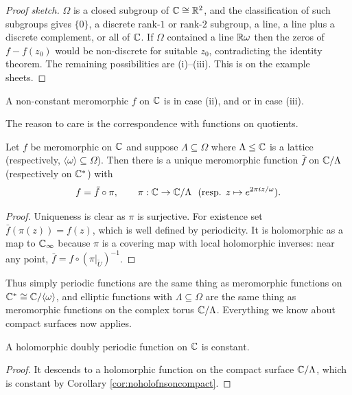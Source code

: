 \documentclass[a4paper]{scrartcl}
\newcommand{\genby}[1]{\langle #1 \rangle}
\newcommand{\Cinf}{\C_\infty}
\newcommand{\Cs}{\C^*}
\begin{document}
\begin{proof}[Proof sketch]
	$\Omega$ is a closed subgroup of $\mathbb{C} \cong \mathbb{R}^2$, and the classification of such
	subgroups gives $\{0\}$, a discrete rank-$1$ or rank-$2$ subgroup, a line, a line plus a
	discrete complement, or all of $\mathbb{C}$. If $\Omega$ contained a line $\mathbb{R}\omega$ then the
	zeros of $f - f(z_0)$ would be non-discrete for suitable $z_0$, contradicting the
	identity theorem. The remaining possibilities are (i)--(iii). This is on the example
	sheets.
\end{proof}

\begin{definition}
	A non-constant meromorphic $f$ on $\mathbb{C}$ is  in case (ii), and
	 or  in case (iii).
\end{definition}

The reason to care is the correspondence with functions on quotients.

\begin{proposition}\label{prop:descend}
	Let $f$ be meromorphic on $\mathbb{C}$ and suppose $\Lambda \subseteq \Omega$ where
	$\Lambda \le \mathbb{C}$ is a lattice (respectively, $\genby{\omega} \subseteq \Omega$). Then
	there is a unique meromorphic function $\bar f$ on $\mathbb{C}/\Lambda$ (respectively on $\Cs$)
	with
	$$
	f = \bar f \circ \pi, \qquad \pi : \mathbb{C} \to \mathbb{C}/\Lambda \ \ (\text{resp. } z \mapsto e^{2\pi i z/\omega}).
	$$
\end{proposition}

\begin{proof}
	Uniqueness is clear as $\pi$ is surjective. For existence set $\bar f(\pi(z)) = f(z)$,
	which is well defined by periodicity. It is holomorphic as a map to $\Cinf$ because
	$\pi$ is a covering map with local holomorphic inverses: near any point,
	$\bar f = f \circ (\pi|_{\tilde U})^{-1}$.
\end{proof}

Thus simply periodic functions are the same thing as meromorphic functions on
$\Cs \cong \C/\genby{\omega}$, and elliptic functions with $\Lambda \subseteq \Omega$ are
the same thing as meromorphic functions on the complex torus $\mathbb{C}/\Lambda$. Everything we
know about compact surfaces now applies.

\begin{corollary}
	A holomorphic doubly periodic function on $\mathbb{C}$ is constant.
\end{corollary}

\begin{proof}
	It descends to a holomorphic function on the compact surface $\mathbb{C}/\Lambda$, which is
	constant by Corollary \ref{cor:noholofnsoncompact}.
\end{proof}
\end{document}
